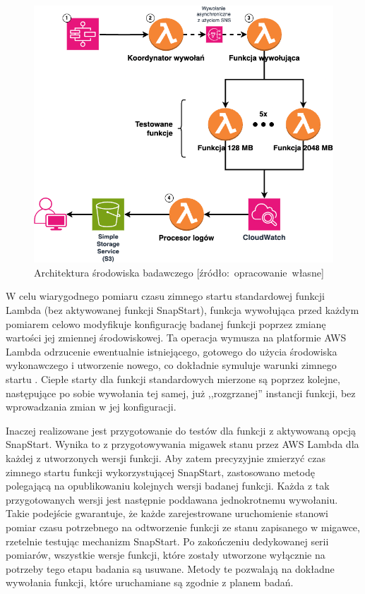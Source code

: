 \begin{figure}[h]
    \centering
    \includegraphics[width=1\textwidth]{charts/experiment-architecture.drawio.png}
    \caption{Architektura środowiska badawczego [źródło:~opracowanie~własne]}
    \label{fig:experiment_architecture}
\end{figure}

W celu wiarygodnego pomiaru czasu zimnego startu standardowej funkcji Lambda (bez aktywowanej funkcji SnapStart), funkcja wywołująca przed każdym pomiarem celowo modyfikuje konfigurację badanej funkcji poprzez zmianę wartości jej zmiennej środowiskowej. 
Ta operacja wymusza na platformie AWS Lambda odrzucenie ewentualnie istniejącego, gotowego do użycia środowiska wykonawczego i utworzenie nowego, co dokładnie symuluje warunki zimnego startu \cite{awsLambdaDocs}.
Ciepłe starty dla funkcji standardowych mierzone są poprzez kolejne, następujące po sobie wywołania tej samej, już ,,rozgrzanej'' instancji funkcji, bez wprowadzania zmian w jej konfiguracji.

Inaczej realizowane jest przygotowanie do testów dla funkcji z aktywowaną opcją SnapStart.
Wynika to z przygotowywania migawek stanu przez AWS Lambda dla każdej z utworzonych wersji funkcji.
Aby zatem precyzyjnie zmierzyć czas zimnego startu funkcji wykorzystującej SnapStart, zastosowano metodę polegającą na opublikowaniu kolejnych wersji badanej funkcji. 
Każda z tak przygotowanych wersji jest następnie poddawana jednokrotnemu wywołaniu. 
Takie podejście gwarantuje, że każde zarejestrowane uruchomienie stanowi pomiar czasu potrzebnego na odtworzenie funkcji ze stanu zapisanego w migawce, rzetelnie testując mechanizm SnapStart. 
Po zakończeniu dedykowanej serii pomiarów, wszystkie wersje funkcji, które zostały utworzone wyłącznie na potrzeby tego etapu badania są usuwane. 
Metody te pozwalają na dokładne wywołania funkcji, które uruchamiane są zgodnie z planem badań.

